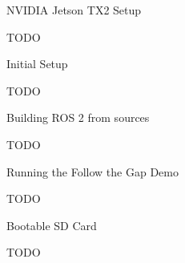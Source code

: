 \chap[jetson] NVIDIA Jetson TX2 Setup

TODO


\sec Initial Setup

TODO


\sec Building ROS 2 from sources

TODO


\sec Running the Follow the Gap Demo

TODO


\sec Bootable SD Card

TODO
